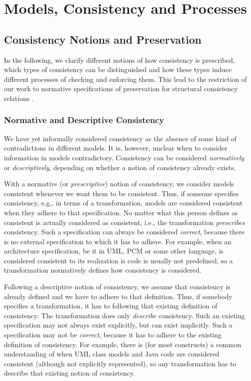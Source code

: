 \chapter{Models, Consistency and Processes
}
\label{chap:networks}

\section{Consistency Notions and Preservation}

In the following, we clarify different notions of how consistency is prescribed, which types of consistency can be distinguished and how these types induce different processes of checking and enforcing them.
This lead to the restriction of our work to normative specifications of preservation for structural consistency relations .

\subsection{Normative and Descriptive Consistency}

We have yet informally considered consistency as the absence of some kind of contradictions in different models.
It is, however, unclear when to consider information in models contradictory.
Consistency can be considered \emph{normatively} or \emph{descriptively}, depending on whether a notion of consistency already exists.

With a normative (or \emph{prescriptive}) notion of consistency, we consider models consistent whenever we want them to be consistent.
Thus, if someone specifies consistency, e.g., in terms of a transformation, models are considered consistent when they adhere to that specification.
No matter what this person defines as consistent is actually considered as consistent, i.e., the transformation \emph{prescribes} consistency.
Such a specification can always be considered \emph{correct}, because there is no external specification to which it has to adhere.
For example, when an architecture specification, be it in \gls{UML}, \gls{PCM} or some other language, is considered consistent to its realization is code is usually not predefined, so a transformation normatively defines how consistency is considered.

Following a descriptive notion of consistency, we assume that consistency is already defined and we have to adhere to that definition.
Thus, if somebody specifies a transformation, it has to following that existing definition of consistency. 
The transformation does only \emph{describe} consistency.
Such an existing specification may not always exist explicitly, but can exist implicitly.
Such a specification may not be \emph{correct}, because it has to adhere to the existing definition of consistency.
For example, there is (for most constructs) a common understanding of when \gls{UML} class models and Java code are considered consistent (although not explicitly represented), so any transformation has to describe that existing notion of consistency.

